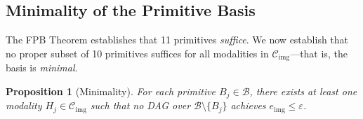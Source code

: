 \documentclass[11pt]{article}
\newtheorem{proposition}[theorem]{Proposition}
\begin{document}
\subsection{Minimality of the Primitive Basis}
\label{sec:minimality}

The FPB Theorem establishes that 11 primitives \emph{suffice}.
We now establish that no proper subset of 10 primitives suffices for all
modalities in $\mathcal{C}_{\mathrm{img}}$---that is, the basis is \emph{minimal}.

\begin{proposition}[Minimality]
\label{prop:minimality}
For each primitive $B_j \in \mathcal{B}$, there exists at least one modality
$H_j \in \mathcal{C}_{\mathrm{img}}$ such that no DAG over
$\mathcal{B} \setminus \{B_j\}$ achieves
$e_{\mathrm{img}} \leq \varepsilon$.
\end{proposition}
\end{document}
